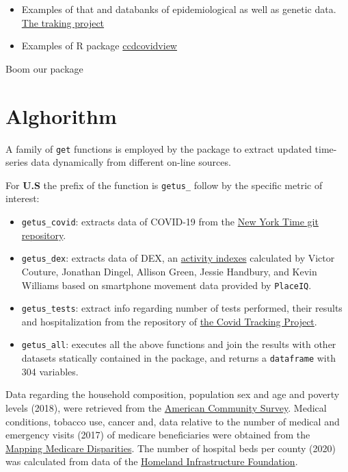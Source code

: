 \documentclass[12pt,halfline,a4paper,]{ouparticle}
\providecommand{\tightlist}{%
  \setlength{\itemsep}{0pt}\setlength{\parskip}{0pt}}
\begin{document}
\begin{itemize}
\item
  Examples of that and databanks of epidemiological as well as genetic
  data. \href{https://covidtracking.com/}{The traking project}
\item
  Examples of R package
  \href{https://feedly.com/i/entry/bdiQAD3fuPUMyDNqrmPKRt6BvYW45zeCOcg+AUEj5wM=_1716a5b8395:28a35fb:7f4666f4}{ccdcovidview}
\end{itemize}

Boom our package

\hypertarget{alghorithm}{%
\section{Alghorithm}\label{alghorithm}}

A family of \texttt{get} functions is employed by the package to extract
updated time-series data dynamically from different on-line sources.

For \textbf{U.S} the prefix of the function is \texttt{getus\_} follow
by the specific metric of interest:

\begin{itemize}
\tightlist
\item
  \texttt{getus\_covid}: extracts data of COVID-19 from the
  \href{https://github.com/nytimes/covid-19-data}{New York Time git
  repository}.
\item
  \texttt{getus\_dex}: extracts data of DEX, an
  \href{https://github.com/COVIDExposureIndices/COVIDExposureIndices}{activity
  indexes} calculated by Victor Couture, Jonathan Dingel, Allison Green,
  Jessie Handbury, and Kevin Williams based on smartphone movement data
  provided by \texttt{PlaceIQ}.
\item
  \texttt{getus\_tests}: extract info regarding number of tests
  performed, their results and hospitalization from the repository of
  \href{https://covidtracking.com/api\%7D}{the Covid Tracking Project}.
\item
  \texttt{getus\_all}: executes all the above functions and join the
  results with other datasets statically contained in the package, and
  returns a \texttt{dataframe} with 304 variables.
\end{itemize}

Data regarding the household composition, population sex and age and
poverty levels (2018), were retrieved from the
\href{https://data.census.gov/cedsci/table?q=United\%20States}{American
Community Survey}. Medical conditions, tobacco use, cancer and, data
relative to the number of medical and emergency visits (2017) of
medicare beneficiaries were obtained from the
\href{https://data.cms.gov/mapping-medicare-disparities}{Mapping
Medicare Disparities}. The number of hospital beds per county (2020) was
calculated from data of the
\href{https://hifld-geoplatform.opendata.arcgis.com/datasets/hospitals/data?page=18}{Homeland
Infrastructure Foundation}.
\end{document}
